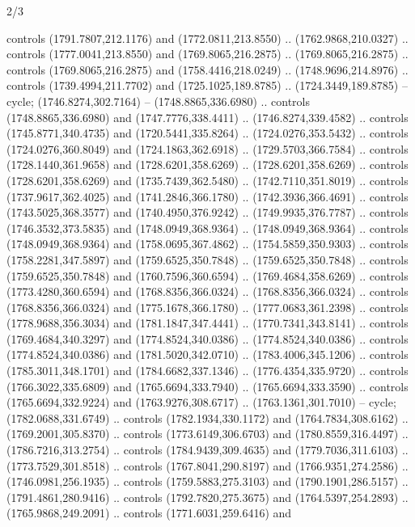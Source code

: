 \begin{flagdescription}{2/3}
\begin{scope}[shift=(c),scale=\flagwidth/391]
\begin{scope}[draw=black,fill=orange,line join=round,line cap=round,y=0.1mm, x=0.1mm,
 line width=0.001\flagwidth, yscale=-1,xscale=1,xshift=-172.5mm,yshift=-25mm]
  controls (1791.7807,212.1176) and (1772.0811,213.8550) .. (1762.9868,210.0327)
  .. controls (1777.0041,213.8550) and (1769.8065,216.2875) ..
  (1769.8065,216.2875) .. controls (1769.8065,216.2875) and (1758.4416,218.0249)
  .. (1748.9696,214.8976) .. controls (1739.4994,211.7702) and
  (1725.1025,189.8785) .. (1724.3449,189.8785) -- cycle;
 (1746.8274,302.7164) -- (1748.8865,336.6980) .. controls
  (1748.8865,336.6980) and (1747.7776,338.4411) .. (1746.8274,339.4582) ..
  controls (1745.8771,340.4735) and (1720.5441,335.8264) .. (1724.0276,353.5432)
  .. controls (1724.0276,360.8049) and (1724.1863,362.6918) ..
  (1729.5703,366.7584) .. controls (1728.1440,361.9658) and (1728.6201,358.6269)
  .. (1728.6201,358.6269) .. controls (1728.6201,358.6269) and
  (1735.7439,362.5480) .. (1742.7110,351.8019) .. controls (1737.9617,362.4025)
  and (1741.2846,366.1780) .. (1742.3936,366.4691) .. controls
  (1743.5025,368.3577) and (1740.4950,376.9242) .. (1749.9935,376.7787) ..
  controls (1746.3532,373.5835) and (1748.0949,368.9364) .. (1748.0949,368.9364)
  .. controls (1748.0949,368.9364) and (1758.0695,367.4862) ..
  (1754.5859,350.9303) .. controls (1758.2281,347.5897) and (1759.6525,350.7848)
  .. (1759.6525,350.7848) .. controls (1759.6525,350.7848) and
  (1760.7596,360.6594) .. (1769.4684,358.6269) .. controls (1773.4280,360.6594)
  and (1768.8356,366.0324) .. (1768.8356,366.0324) .. controls
  (1768.8356,366.0324) and (1775.1678,366.1780) .. (1777.0683,361.2398) ..
  controls (1778.9688,356.3034) and (1781.1847,347.4441) .. (1770.7341,343.8141)
  .. controls (1769.4684,340.3297) and (1774.8524,340.0386) ..
  (1774.8524,340.0386) .. controls (1774.8524,340.0386) and (1781.5020,342.0710)
  .. (1783.4006,345.1206) .. controls (1785.3011,348.1701) and
  (1784.6682,337.1346) .. (1776.4354,335.9720) .. controls (1766.3022,335.6809)
  and (1765.6694,333.7940) .. (1765.6694,333.3590) .. controls
  (1765.6694,332.9224) and (1763.9276,308.6717) .. (1763.1361,301.7010) --
  cycle;
 (1782.0688,331.6749) .. controls (1782.1934,330.1172) and
  (1764.7834,308.6162) .. (1769.2001,305.8370) .. controls (1773.6149,306.6703)
  and (1780.8559,316.4497) .. (1786.7216,313.2754) .. controls
  (1784.9439,309.4635) and (1779.7036,311.6103) .. (1773.7529,301.8518) ..
  controls (1767.8041,290.8197) and (1766.9351,274.2586) .. (1746.0981,256.1935)
  .. controls (1759.5883,275.3103) and (1790.1901,286.5157) ..
  (1791.4861,280.9416) .. controls (1792.7820,275.3675) and (1764.5397,254.2893)
  .. (1765.9868,249.2091) .. controls (1771.6031,259.6416) and

\end{scope}
\end{scope}
\end{flagdescription}
